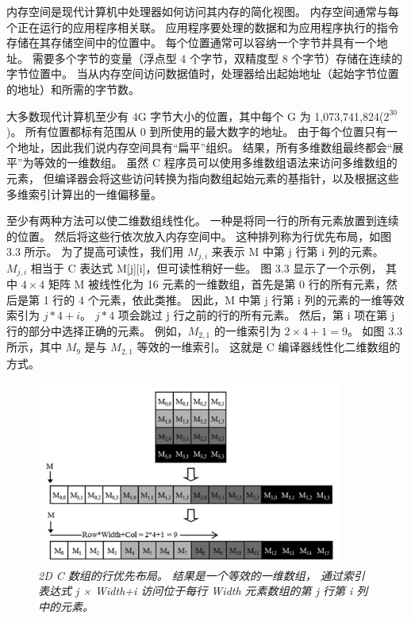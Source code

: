 \begin{remark}[内存空间]
内存空间是现代计算机中处理器如何访问其内存的简化视图。 内存空间通常与每个正在运行的应用程序相关联。 
应用程序要处理的数据和为应用程序执行的指令存储在其存储空间中的位置中。 每个位置通常可以容纳一个字节并具有一个地址。 
需要多个字节的变量（浮点型 4 个字节，双精度型 8 个字节）存储在连续的字节位置中。 
当从内存空间访问数据值时，处理器给出起始地址（起始字节位置的地址）和所需的字节数。

大多数现代计算机至少有 4G 字节大小的位置，其中每个 G 为 1,073,741,824($2^{30}$)。 
所有位置都标有范围从 0 到所使用的最大数字的地址。 由于每个位置只有一个地址，因此我们说内存空间具有“扁平”组织。 
结果，所有多维数组最终都会“展平”为等效的一维数组。 虽然 C 程序员可以使用多维数组语法来访问多维数组的元素，
但编译器会将这些访问转换为指向数组起始元素的基指针，以及根据这些多维索引计算出的一维偏移量。
\end{remark}

至少有两种方法可以使二维数组线性化。 一种是将同一行的所有元素放置到连续的位置。 然后将这些行依次放入内存空间中。 
这种排列称为行优先布局，如图 3.3 所示。 为了提高可读性，我们用 $M_{j,i}$ 来表示 M 中第 j 行第 i 列的元素。 
$M_{j,i}$ 相当于 C 表达式 M[j][i]，但可读性稍好一些。 图 3.3 显示了一个示例，
其中 $4 \times 4$ 矩阵 M 被线性化为 16 元素的一维数组，首先是第 0 行的所有元素，然后是第 1 行的 4 个元素，依此类推。 
因此，M 中第 j 行第 i 列的元素的一维等效索引为 $j * 4 + i$。 $j * 4$ 项会跳过 j 行之前的行的所有元素。 
然后，第 i 项在第 j 行的部分中选择正确的元素。 例如，$M_{2,1}$ 的一维索引为 $2 × 4 + 1 = 9$。
如图 3.3 所示，其中 $M_9$ 是与 $M_{2,1}$ 等效的一维索引。 这就是 C 编译器线性化二维数组的方式。

\begin{figure}[H]
	\centering
	\includegraphics[width=0.9\textwidth]{figs/F3.3.png}
	\caption{\textit{2D C 数组的行优先布局。 结果是一个等效的一维数组，
	通过索引表达式 j × Width+i 访问位于每行 Width 元素数组的第 j 行第 i 列中的元素。}}
\end{figure}

